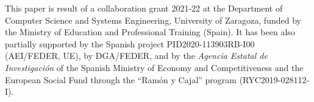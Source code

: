 \documentclass[
]{ceurart}
\begin{document}
\begin{acknowledgments}
This paper is result of a collaboration grant 2021-22 at the Department of Computer Science and Systems Engineering, University of Zaragoza, funded by the Ministry of Education and Professional Training (Spain). It has been also partially supported by the Spanish project PID2020-113903RB-I00 (AEI/FEDER, UE), by DGA/FEDER, and by the {\em Agencia Estatal de Investigación} of the Spanish Ministry of Economy and  Competitiveness and the European Social Fund through the ``Ramón y Cajal'' program (RYC2019-028112-I).
\end{acknowledgments}


\end{document}
